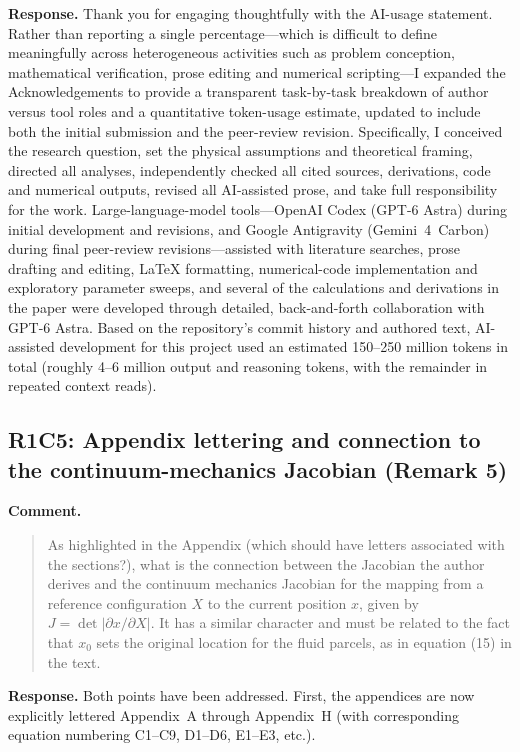\documentclass[11pt]{article}
\newcommand{\response}[1]{\noindent\textcolor{responseblue}{#1}}
\begin{document}
\response{\textbf{Response.} Thank you for engaging thoughtfully with the AI-usage statement. Rather than reporting a single percentage---which is difficult to define meaningfully across heterogeneous activities such as problem conception, mathematical verification, prose editing and numerical scripting---I expanded the Acknowledgements to provide a transparent task-by-task breakdown of author versus tool roles and a quantitative token-usage estimate, updated to include both the initial submission and the peer-review revision. Specifically, I conceived the research question, set the physical assumptions and theoretical framing, directed all analyses, independently checked all cited sources, derivations, code and numerical outputs, revised all AI-assisted prose, and take full responsibility for the work. Large-language-model tools---OpenAI Codex (GPT-6 Astra) during initial development and revisions, and Google Antigravity (Gemini~4~Carbon) during final peer-review revisions---assisted with literature searches, prose drafting and editing, LaTeX formatting, numerical-code implementation and exploratory parameter sweeps, and several of the calculations and derivations in the paper were developed through detailed, back-and-forth collaboration with GPT-6 Astra. Based on the repository's commit history and authored text, AI-assisted development for this project used an estimated 150--250 million tokens in total (roughly 4--6 million output and reasoning tokens, with the remainder in repeated context reads).}

\subsection*{R1C5: Appendix lettering and connection to the continuum-mechanics Jacobian (Remark 5)}

\noindent\textbf{Comment.}
\begin{quote}
As highlighted in the Appendix (which should have letters associated with the sections?), what is the connection between the Jacobian the author derives and the continuum mechanics Jacobian for the mapping from a reference configuration \(X\) to the current position \(x\), given by \(J = \det|\partial x/\partial X|\). It has a similar character and must be related to the fact that \(x_0\) sets the original location for the fluid parcels, as in equation (15) in the text.
\end{quote}

\response{\textbf{Response.} Both points have been addressed. First, the appendices are now explicitly lettered Appendix~A through Appendix~H (with corresponding equation numbering C1--C9, D1--D6, E1--E3, etc.).}
\end{document}
